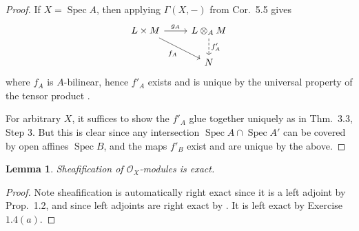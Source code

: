 \documentclass[10pt]{article}
\newtheorem{lemma}[subsubsection]{Lemma}
\theoremstyle{definition}
\theoremstyle{remark}
\numberwithin{equation}{section}
\numberwithin{figure}{subsubsection}
\DeclareMathOperator{\Spec}{Spec}
\newcommand{\OO}{\mathcal{O}}
\begin{document}
\begin{proof}
  If $X = \Spec A$, then applying $\Gamma(X,-)$ from Cor.~5.5 gives
  \begin{equation*}
    \begin{tikzcd}
      L \times M \rar{g_A}\arrow{dr}[swap]{f_A} & L \otimes_A M\dar[dashed]{f'_A}\\
      & N
    \end{tikzcd}
  \end{equation*}
  where $f_A$ is $A$-bilinear, hence $f'_A$ exists and is unique by the universal property of the tensor product \cite[Prop.~2.12]{AM69}.
  \par For arbitrary $X$, it suffices to show the $f'_A$ glue together uniquely as in Thm.~3.3, Step 3. But this is clear since any intersection $\Spec A \cap \Spec A'$ can be covered by open affines $\Spec B$, and the maps $f'_B$ exist and are unique by the above.
\end{proof}
\begin{lemma}\label{sheafifyexact}
  Sheafification of $\OO_X$-modules is exact.
\end{lemma}
\begin{proof}
  Note sheafification is automatically right exact since it is a left adjoint by
  Prop.~1.2, and since left adjoints are right exact by
  \cite[Thm.~2.6.1]{Wei94}. It is left exact by Exercise $1.4(a)$.
\end{proof}
\end{document}
